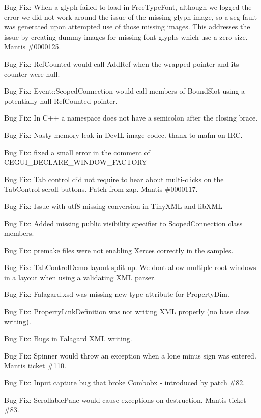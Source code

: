 \begin{DoxyItemize}
\item Bug Fix\+: When a glyph failed to load in Free\+Type\+Font, although we logged the error we did not work around the issue of the missing glyph image, so a seg fault was generated upon attempted use of those missing images. This addresses the issue by creating dummy images for missing font glyphs which use a zero size. Mantis \#0000125.
\item Bug Fix\+: Ref\+Counted would call Add\+Ref when the wrapped pointer and its counter were null.
\item Bug Fix\+: Event\+::\+Scoped\+Connection would call members of Bound\+Slot using a potentially null Ref\+Counted pointer.
\item Bug Fix\+: In C++ a namespace does not have a semicolon after the closing brace.
\item Bug Fix\+: Nasty memory leak in Dev\+IL image codec. thanx to mafm on I\+RC.
\item Bug Fix\+: fixed a small error in the comment of C\+E\+G\+U\+I\+\_\+\+D\+E\+C\+L\+A\+R\+E\+\_\+\+W\+I\+N\+D\+O\+W\+\_\+\+F\+A\+C\+T\+O\+RY
\item Bug Fix\+: Tab control did not require to hear about multi-\/clicks on the Tab\+Control scroll buttons. Patch from zap. Mantis \#0000117.
\item Bug Fix\+: Issue with utf8 missing conversion in Tiny\+X\+ML and lib\+X\+ML
\item Bug Fix\+: Added missing public visibility specifier to Scoped\+Connection class members.
\item Bug Fix\+: premake files were not enabling Xerces correctly in the samples.
\item Bug Fix\+: Tab\+Control\+Demo layout split up. We dont allow multiple root windows in a layout when using a validating X\+ML parser.
\item Bug Fix\+: Falagard.\+xsd was missing new type attribute for Property\+Dim.
\item Bug Fix\+: Property\+Link\+Definition was not writing X\+ML properly (no base class writing).
\item Bug Fix\+: Bugs in Falagard X\+ML writing.
\item Bug Fix\+: Spinner would throw an exception when a lone minus sign was entered. Mantis ticket \#110.
\item Bug Fix\+: Input capture bug that broke Combobx -\/ introduced by patch \#82.
\item Bug Fix\+: Scrollable\+Pane would cause exceptions on destruction. Mantis ticket \#83.

\end{DoxyItemize}
